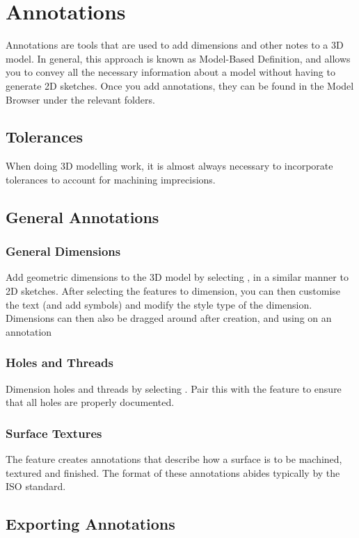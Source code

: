 \chapter{Annotations}

Annotations are tools that are used to add dimensions and other notes to a 3D model. In general, this approach is known as Model-Based Definition, and allows you to convey all the necessary information about a model without having to generate 2D sketches. Once you add annotations, they can be found in the Model Browser under the relevant folders.

\section{Tolerances}

When doing 3D modelling work, it is almost always necessary to incorporate tolerances to account for machining imprecisions.

\section{General Annotations}

\subsection{General Dimensions}

Add geometric dimensions to the 3D model by selecting , in a similar manner to 2D sketches. After selecting the features to dimension, you can then customise the text (and add symbols) and modify the style type of the dimension. Dimensions can then also be dragged around after creation, and using  on an annotation 

\subsection{Holes and Threads}

Dimension holes and threads by selecting . Pair this with the  feature to ensure that all holes are properly documented.

\subsection{Surface Textures}

The  feature creates annotations that describe how a surface is to be machined, textured and finished. The format of these annotations abides typically by the ISO standard.

\section{Exporting Annotations}